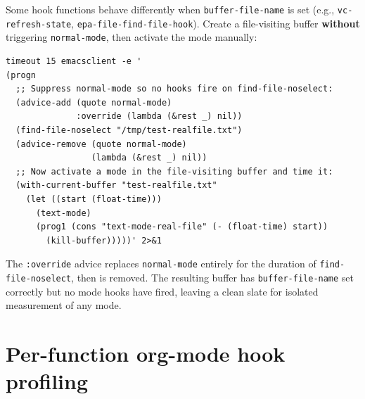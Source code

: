 Some hook functions behave differently when \texttt{buffer-file-name} is set (e.g., \texttt{vc-refresh-state}, \texttt{epa-file-find-file-hook}). Create a file-visiting buffer \textbf{without} triggering \texttt{normal-mode}, then activate the mode manually:

\begin{verbatim}
timeout 15 emacsclient -e '
(progn
  ;; Suppress normal-mode so no hooks fire on find-file-noselect:
  (advice-add (quote normal-mode)
              :override (lambda (&rest _) nil))
  (find-file-noselect "/tmp/test-realfile.txt")
  (advice-remove (quote normal-mode)
                 (lambda (&rest _) nil))
  ;; Now activate a mode in the file-visiting buffer and time it:
  (with-current-buffer "test-realfile.txt"
    (let ((start (float-time)))
      (text-mode)
      (prog1 (cons "text-mode-real-file" (- (float-time) start))
        (kill-buffer)))))' 2>&1
\end{verbatim}

The \texttt{:override} advice replaces \texttt{normal-mode} entirely for the duration of \texttt{find-file-noselect}, then is removed. The resulting buffer has \texttt{buffer-file-name} set correctly but no mode hooks have fired, leaving a clean slate for isolated measurement of any mode.

\section{Per-function org-mode hook profiling}\label{per-function-org-mode-hook-profiling}

